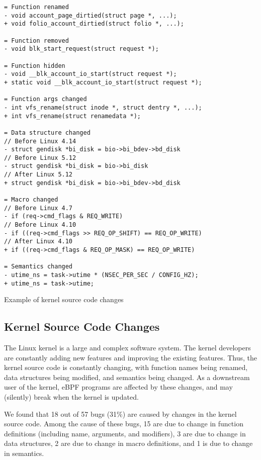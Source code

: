 \begin{listing}[t]
  \begin{verbatim}
= Function renamed
- void account_page_dirtied(struct page *, ...);
+ void folio_account_dirtied(struct folio *, ...);

= Function removed
- void blk_start_request(struct request *);

= Function hidden
- void __blk_account_io_start(struct request *);
+ static void __blk_account_io_start(struct request *);

= Function args changed
- int vfs_rename(struct inode *, struct dentry *, ...);
+ int vfs_rename(struct renamedata *);

= Data structure changed
// Before Linux 4.14
- struct gendisk *bi_disk = bio->bi_bdev->bd_disk
// Before Linux 5.12
- struct gendisk *bi_disk = bio->bi_disk
// After Linux 5.12
+ struct gendisk *bi_disk = bio->bi_bdev->bd_disk

= Macro changed
// Before Linux 4.7
- if (req->cmd_flags & REQ_WRITE)
// Before Linux 4.10
- if ((req->cmd_flags >> REQ_OP_SHIFT) == REQ_OP_WRITE)
// After Linux 4.10
+ if ((req->cmd_flags & REQ_OP_MASK) == REQ_OP_WRITE)

= Semantics changed
- utime_ns = task->utime * (NSEC_PER_SEC / CONFIG_HZ);
+ utime_ns = task->utime;
\end{verbatim}
  \caption{Example of kernel source code changes}
  \label{fig:kernel_source_code_changes}
\end{listing}



\subsection{Kernel Source Code Changes}
The Linux kernel is a large and complex software system.
The kernel developers are constantly adding new features and improving the existing features.
Thus, the kernel source code is constantly changing, with function names being renamed, data structures being modified, and semantics being changed.
As a downstream user of the kernel, eBPF programs are affected by these changes, and may (silently) break when the kernel is updated.

We found that 18 out of 57 bugs (31\%) are caused by changes in the kernel source code.
Among the cause of these bugs, 15 are due to change in function definitions (including name, arguments, and modifiers), 3 are due to change in data structures, 2 are due to change in macro definitions, and 1 is due to change in semantics. 

